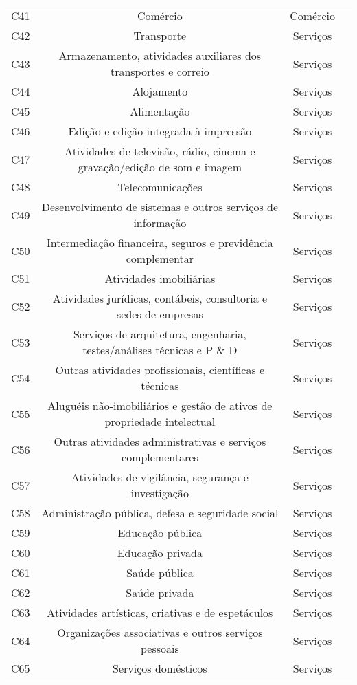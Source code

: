 \begin{apendicesenv}
\begin{small}
\begin{center}
\begin{longtable}{lccc}
				C41 & Comércio & Comércio \\
				C42 & Transporte & Serviços \\
				C43 & Armazenamento, atividades auxiliares dos transportes e correio & Serviços \\
				C44 & Alojamento & Serviços \\
				C45 & Alimentação & Serviços \\
				C46 & Edição e edição integrada à impressão & Serviços \\
				C47 & Atividades de televisão, rádio, cinema e    gravação/edição de som e imagem & Serviços \\
				C48 & Telecomunicações & Serviços \\
				C49 & Desenvolvimento de sistemas e outros serviços de informação & Serviços \\
				C50 & Intermediação financeira, seguros e previdência complementar & Serviços \\
				C51 & Atividades imobiliárias & Serviços \\
				C52 & Atividades jurídicas, contábeis, consultoria e sedes de empresas & Serviços \\
				C53 & Serviços de arquitetura, engenharia, testes/análises técnicas e P \& D & Serviços \\
				C54 & Outras atividades profissionais, científicas e técnicas & Serviços \\
				C55 & Aluguéis não-imobiliários e gestão de ativos de propriedade intelectual & Serviços \\
				C56 & Outras atividades administrativas e serviços complementares & Serviços \\
				C57 & Atividades de vigilância, segurança e investigação & Serviços \\
				C58 & Administração pública, defesa e seguridade social & Serviços \\
				C59 & Educação pública & Serviços \\
				C60 & Educação privada & Serviços \\
				C61 & Saúde pública & Serviços \\
				C62 & Saúde privada & Serviços \\
				C63 & Atividades artísticas, criativas e de espetáculos & Serviços \\
				C64 & Organizações associativas e outros serviços pessoais & Serviços \\
				C65 & Serviços domésticos & Serviços \\ \hline
			\end{longtable}
		\end{center}
	\end{small}


\end{apendicesenv}
